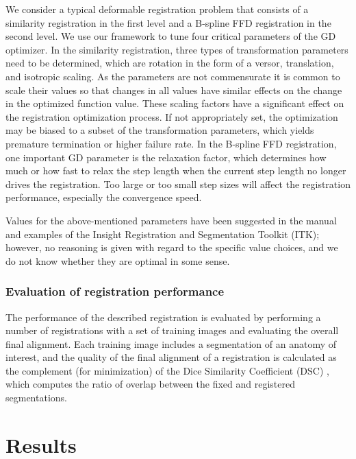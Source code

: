 \documentclass[]{spie}  %
\begin{document}
We consider a typical deformable registration problem that consists of a similarity registration in the first level and a B-spline FFD registration in the second level. We use our framework to tune four critical parameters of the GD optimizer. 
In the similarity registration, three types of transformation parameters need to be determined, which are rotation in the form of a versor, translation, and isotropic scaling. As the parameters are not commensurate it is common to scale their values so that changes in all values have similar effects on the change in the optimized function value. These scaling factors have a significant effect on the registration optimization process. If not appropriately set, the optimization may be biased to a subset of the transformation parameters, which yields premature termination or higher failure rate. 
In the B-spline FFD registration, one important GD parameter is the relaxation factor, which determines how much or how fast to relax the step length when the current step length no longer drives the registration. Too large or too small step sizes will affect the registration performance, especially the convergence speed. 

Values for the above-mentioned parameters have been suggested in the manual and examples of the Insight Registration and Segmentation Toolkit (ITK)\cite{itk:v2.4}; however, no reasoning is given with regard to the specific value choices, and we do not know whether they are optimal in some sense.

\subsubsection{Evaluation of registration performance}

The performance of the described registration is evaluated by performing a number of registrations with a set of training images and evaluating the overall final alignment. Each training image includes a segmentation of an anatomy of interest, and the quality of the final alignment of a registration is calculated as the complement (for minimization) of the Dice Similarity Coefficient (DSC) \cite{dsc}, which computes the ratio of overlap between the fixed and registered segmentations. 

\section{Results}
\end{document}
